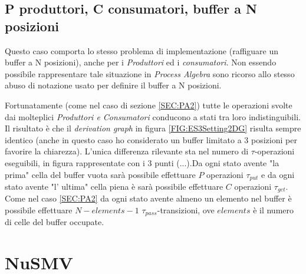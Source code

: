 \documentclass[a4paper]{article}
\begin{document}
\subsection{P produttori, C consumatori, buffer a N posizioni}
Questo caso comporta lo stesso problema di implementazione (raffiguare un buffer a N posizioni), anche per i \textit{Produttori} ed i \textit{consumatori}.
Non essendo possibile rappresentare tale situazione in \textit{Process Algebra} sono ricorso allo stesso abuso di notazione usato per definire il buffer a N posizioni.\\
\begin{figure}[!ht]
  \label{FIG:ES3Setting3SYS}
\end{figure}
Fortunatamente (come nel caso di sezione \ref{SEC:PA2}) tutte le operazioni svolte dai molteplici \textit{Produttori \textit{e} Consumatori} conducono a stati tra loro indistinguibili.\\
Il risultato è che il \textit{derivation graph} in figura \ref{FIG:ES3Setting2DG} risulta sempre identico (anche in questo caso ho considerato un buffer limitato a 3 posizioni per favorire la chiarezza).
L'unica differenza rilevante sta nel numero di $\tau$-operazioni eseguibili, in figura rappresentate con i 3 punti ($...$).Da ogni stato avente "la prima" cella del buffer vuota sarà possibile effettuare $P$ operazioni $\tau_{put}$ e da ogni stato avente "l' ultima" cella piena è sarà possibile effettuare $C$ operazioni $\tau_{get}$.\\
Come nel caso \ref{SEC:PA2} da ogni stato avente almeno un elemento nel buffer è possibile effettuare $N - elements - 1$ $\tau_{pass}$-transizioni, ove $elements$ è il numero di celle del buffer occupate.\\
\newpage
\begin{figure}[!ht]
  \label{FIG:ES3Setting3DG}
\end{figure}
\newpage

\section{NuSMV}
\end{document}

